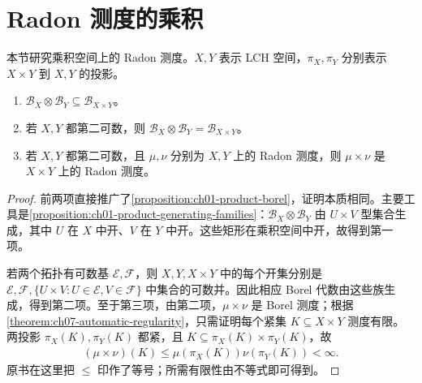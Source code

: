 \documentclass[../../main.tex]{subfiles}
\begin{document}
\section{Radon 测度的乘积}\label{section:ch07-radon-products}\label{section:ch07-products-topological-spaces}
本节研究乘积空间上的 Radon 测度。$X,Y$ 表示 LCH 空间，$\pi_X,\pi_Y$ 分别表示 $X\times Y$ 到 $X,Y$ 的投影。
\begin{theorem}\label{theorem:ch07-product-borel-radon}
\begin{enumerate}
\item\label{item:ch07-product-borel-inclusion} $\mathscr B_X\otimes\mathscr B_Y\subseteq\mathscr B_{X\times Y}$。
\item\label{item:ch07-product-borel-equality} 若 $X,Y$ 都第二可数，则 $\mathscr B_X\otimes\mathscr B_Y=\mathscr B_{X\times Y}$。
\item\label{item:ch07-second-countable-product-radon} 若 $X,Y$ 都第二可数，且 $\mu,\nu$ 分别为 $X,Y$ 上的 Radon 测度，则 $\mu\times\nu$ 是 $X\times Y$ 上的 Radon 测度。
\end{enumerate}
\end{theorem}
\begin{proof}
前两项直接推广了\cref{proposition:ch01-product-borel}，证明本质相同。主要工具是\cref{proposition:ch01-product-generating-families}：$\mathscr B_X\otimes\mathscr B_Y$ 由 $U\times V$ 型集合生成，其中 $U$ 在 $X$ 中开、$V$ 在 $Y$ 中开。这些矩形在乘积空间中开，故得到第一项。

若两个拓扑有可数基 $\mathcal E,\mathcal F$，则 $X,Y,X\times Y$ 中的每个开集分别是 $\mathcal E,\mathcal F,\{U\times V:U\in\mathcal E,V\in\mathcal F\}$ 中集合的可数并。因此相应 Borel 代数由这些族生成，得到第二项。至于第三项，由第二项，$\mu\times\nu$ 是 Borel 测度；根据\cref{theorem:ch07-automatic-regularity}，只需证明每个紧集 $K\subseteq X\times Y$ 测度有限。两投影 $\pi_X(K),\pi_Y(K)$ 都紧，且 $K\subseteq\pi_X(K)\times\pi_Y(K)$，故
\begin{align*}
(\mu\times\nu)(K)\leqslant\mu(\pi_X(K))\nu(\pi_Y(K))<\infty.
\end{align*}
原书在这里把 $\leqslant$ 印作了等号；所需有限性由不等式即可得到。
\end{proof}
\end{document}
